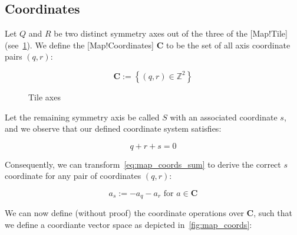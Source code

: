 \subsection{Coordinates}

Let \(Q\) and \(R\) be two distinct symmetry axes out of the three of the [Map!Tile] (see~\ref{fig:map_tile_axes}).
We define the [Map!Coordinates] \(\mathbf{C}\) to be the set of all axis coordinate pairs \((q, r)\):

\begin{equation}\label{eq:map_coords_qr}
    \mathbf{C} := \left \{ (q, r) \in \mathbb{Z}^2 \right \}
\end{equation}

\begin{figure}[htbp]
    \centering
    \caption{Tile axes}\label{fig:map_tile_axes}
\end{figure}

Let the remaining symmetry axis be called \(S\) with an associated coordinate \(s\), and we observe that our defined coordinate system satisfies:

\begin{equation}\label{eq:map_coords_sum}
    q + r + s = 0
\end{equation}

Consequently, we can transform~\eqref{eq:map_coords_sum} to derive the correct \(s\) coordinate for any pair of coordinates \((q, r)\):

\begin{equation}\label{eq:map_coords_s}
    a_s := -a_q - a_r\text{ for \(a \in \mathbf{C}\)}
\end{equation}

We can now define (without proof) the coordinate operations over \(\mathbf{C}\), such that we define a coordiante vector space as depicted in~\ref{fig:map_coords}:

